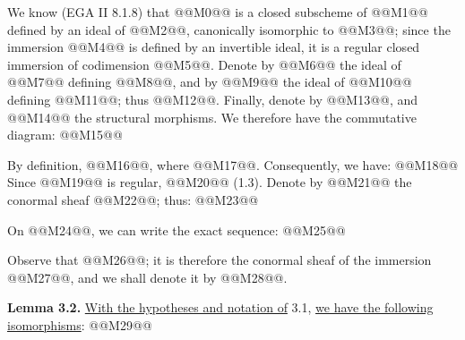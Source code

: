 We know (EGA II 8.1.8) that @@M0@@ is a closed subscheme of @@M1@@ defined by an ideal of @@M2@@, canonically isomorphic to @@M3@@; since the immersion @@M4@@ is defined by an invertible ideal, it is a regular closed immersion of codimension @@M5@@. Denote by @@M6@@ the ideal of @@M7@@ defining @@M8@@, and by @@M9@@ the ideal of @@M10@@ defining @@M11@@; thus @@M12@@. Finally, denote by @@M13@@, and @@M14@@ the structural morphisms. We therefore have the commutative diagram:
@@M15@@

By definition, @@M16@@, where @@M17@@. Consequently, we have:
@@M18@@
Since @@M19@@ is regular, @@M20@@ (1.3). Denote by @@M21@@ the conormal sheaf @@M22@@; thus:
@@M23@@

On @@M24@@, we can write the exact sequence:
@@M25@@

Observe that @@M26@@; it is therefore the conormal sheaf of the immersion @@M27@@, and we shall denote it by @@M28@@.

\textbf{Lemma 3.2.} \uline{With the hypotheses and notation of} 3.1, \uline{we have the following isomorphisms}:
@@M29@@
